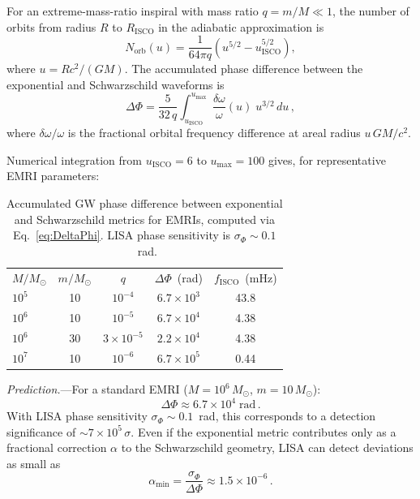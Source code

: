 \documentclass[prl,twocolumn,superscriptaddress,longbibliography]{revtex4-2}
\begin{document}
For an extreme-mass-ratio inspiral with mass ratio
$q = m/M \ll 1$, the number of orbits from radius $R$ to
$R_{\mathrm{ISCO}}$ in the adiabatic approximation is
\begin{equation}
  N_{\mathrm{orb}}(u)
  = \frac{1}{64\pi q}
  \left(u^{5/2} - u_{\mathrm{ISCO}}^{5/2}\right),
\end{equation}
where $u = R c^2/(GM)$.  The accumulated phase difference
between the exponential and Schwarzschild waveforms is
\begin{equation}
  \Delta\Phi = \frac{5}{32\,q}\int_{u_{\mathrm{ISCO}}}^{u_{\max}}
  \!\frac{\delta\omega}{\omega}(u)\;u^{3/2}\,du\,,
  \label{eq:DeltaPhi}
\end{equation}
where $\delta\omega/\omega$ is the fractional orbital frequency
difference at areal radius $u\,GM/c^2$.

Numerical integration from $u_{\mathrm{ISCO}} = 6$ to
$u_{\max} = 100$ gives, for representative EMRI parameters:

\begin{table}[t]
\caption{\label{tab:emri}%
Accumulated GW phase difference between exponential and
Schwarzschild metrics for EMRIs, computed via
Eq.~\eqref{eq:DeltaPhi}.  LISA phase sensitivity is
$\sigma_\Phi \sim 0.1$~rad.}
\begin{ruledtabular}
\begin{tabular}{lcccc}
  $M/M_\odot$ & $m/M_\odot$ & $q$ & $\Delta\Phi$~(rad)
    & $f_{\mathrm{ISCO}}$~(mHz) \\
  \colrule
  $10^5$ & 10 & $10^{-4}$ & $6.7\times 10^3$ & 43.8 \\
  $10^6$ & 10 & $10^{-5}$ & $6.7\times 10^4$ & 4.38 \\
  $10^6$ & 30 & $3\times 10^{-5}$ & $2.2\times 10^4$ & 4.38 \\
  $10^7$ & 10 & $10^{-6}$ & $6.7\times 10^5$ & 0.44 \\
\end{tabular}
\end{ruledtabular}
\end{table}

\emph{Prediction.}---For a standard EMRI ($M = 10^6\,M_\odot$,
$m = 10\,M_\odot$):
\begin{equation}
  \boxed{\Delta\Phi \approx 6.7 \times 10^4\;\mathrm{rad}}\,.
  \label{eq:DeltaPhi_value}
\end{equation}
With LISA phase sensitivity $\sigma_\Phi \sim 0.1$~rad,
this corresponds to a detection significance of
$\sim 7 \times 10^5\,\sigma$.  Even if the exponential metric
contributes only as a fractional correction $\alpha$ to the
Schwarzschild geometry, LISA can detect deviations as small as
\begin{equation}
  \alpha_{\min} = \frac{\sigma_\Phi}{\Delta\Phi}
  \approx 1.5 \times 10^{-6}\,.
  \label{eq:alpha_min}
\end{equation}
\end{document}
